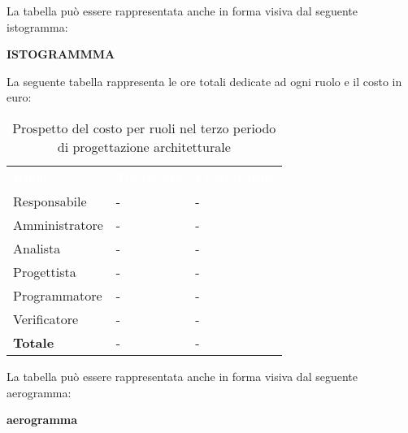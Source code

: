 La tabella può essere rappresentata anche in forma visiva dal seguente istogramma:

\textbf{ISTOGRAMMMA}


La seguente tabella rappresenta le ore totali dedicate ad ogni ruolo e il costo in euro:

\begin{table}[!htbp]
\begin{center}
\renewcommand{\arraystretch}{1.5}
\begin{tabular}{ m{}<{\centering}  m{}<{\centering} m{}<{\centering}}
	\rowcolor{darkblue}
	\textcolor{white}{\textbf{Ruolo}}&\textcolor{white}{\textbf{Totale ore}}&\textcolor{white}{\textbf{Costo totale}}\\ 

	Responsabile  & - & - \\	

	\rowcolor{gray!10} Amministratore & - & - \\
	
	Analista & - & - \\
	
	\rowcolor{gray!10} Progettista & - & - \\
	
	Programmatore & - & - \\
	
	\rowcolor{gray!10} Verificatore & - & - \\
	
	\textbf{Totale} & - & - \\
	
\end{tabular}
\caption{Prospetto del costo per ruoli nel terzo periodo di progettazione architetturale}
\end{center}
\end{table}

La tabella può essere rappresentata anche in forma visiva dal seguente aerogramma:

\textbf{aerogramma}



